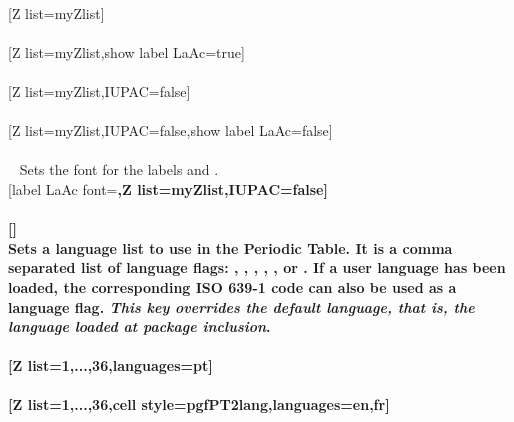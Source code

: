 \pgfPTstyle[show title=false,show legend=false,show group numbers=false]%
\\ [-4pt][Z list=myZlist]%
\\ [5pt]\makebox[\linewidth][c]{\scalebox{.6}{\pgfPT[Z list=myZlist]}}%
\\ [5pt][Z list=myZlist,show label LaAc=true]%
\\ [5pt]\makebox[\linewidth][c]{\scalebox{.6}{\pgfPT[Z list=myZlist,show label LaAc=true]}}%
\\ [5pt][Z list=myZlist,IUPAC=false]%
\\ [5pt]\makebox[\linewidth][c]{\scalebox{.6}{\pgfPT[Z list=myZlist,IUPAC=false]}}%
\\ [5pt][Z list=myZlist,IUPAC=false,show label LaAc=false]%
\\ [5pt]\makebox[\linewidth][c]{\scalebox{.6}{\pgfPT[Z list=myZlist,IUPAC=false,show label LaAc=false]}}%
\\ [5pt]\pgfPTendoption%
\newpage\vspace{-34pt}\ %
\label{option_label LaAc font}%
%
{Sets the font for the labels  and .}%
\\ [5pt][label LaAc font=\string\bfseries,Z list=myZlist,IUPAC=false]%
\\ [10pt]\makebox[\linewidth][c]{\scalebox{.6}{\pgfPT[label LaAc font=\bfseries,Z list=myZlist,IUPAC=false]}}%
\\ [5pt][]%
\pgfPTresetstyle%
\\ [-10pt]\pgfPTendoption%
\vfill
\label{option_languages}%
%
{Sets a language list to use in the Periodic Table. It is a comma separated list of language flags: , , , , ,  or . If a user language has been loaded, the corresponding ISO 639-1 code can also be used as a language flag. \textit{This key overrides the default language, that is, the language loaded at package inclusion}.\\ \ }%
\\ [5pt][Z list={1,...,36},languages=pt]%
\\ [10pt]\makebox[\linewidth][c]{\scalebox{.6}{\pgfPT[Z list={1,...,36},languages=pt]}}%
\\ [10pt][Z list={1,...,36},cell style=pgfPT2lang,languages={en,fr}]%
